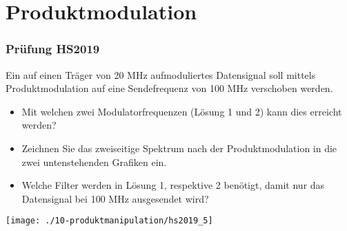 

\section{Produktmodulation}

\subsubsection{Prüfung HS2019}
Ein auf einen Träger von 20 MHz aufmoduliertes Datensignal soll mittels Produktmodulation auf eine Sendefrequenz von 100 MHz verschoben werden.
\begin{itemize}
    \item Mit welchen zwei Modulatorfrequenzen (Lösung 1 und 2) kann dies erreicht werden?
    \item Zeichnen Sie das zweiseitige Spektrum nach der Produktmodulation in die zwei untenstehenden Grafiken ein.
    \item Welche Filter werden in Lösung 1, respektive 2 benötigt, damit nur das Datensignal bei 100 MHz ausgesendet wird?
\end{itemize}

\begin{center}
    \vspace{-8pt}
    \texttt{[image: ./10-produktmanipulation/hs2019\_5]}
    \vspace{-8pt}
\end{center}